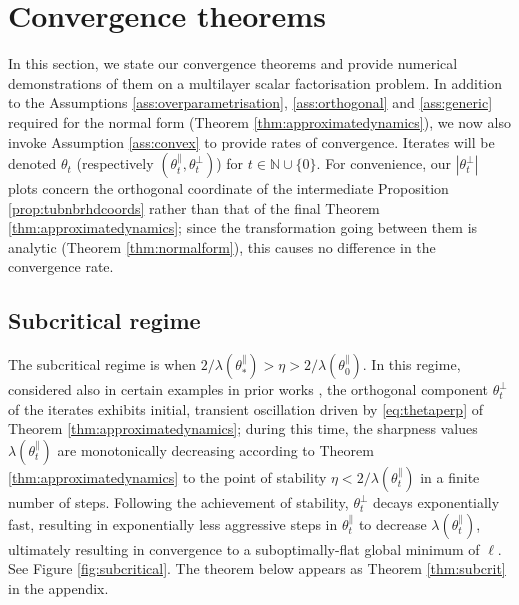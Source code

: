 \documentclass{article}
\newcommand{\NB}{\mathbb{N}}
\newcommand{\tpa}{\theta^{\parallel}}
\newcommand{\tpe}{\theta^{\perp}}
\theoremstyle{plain}
\theoremstyle{definition}
\theoremstyle{remark}
\begin{document}
\section{Convergence theorems}

In this section, we state our convergence theorems and provide numerical demonstrations of them on a multilayer scalar factorisation problem. In addition to the Assumptions \ref{ass:overparametrisation}, \ref{ass:orthogonal} and \ref{ass:generic} required for the normal form (Theorem \ref{thm:approximatedynamics}), we now also invoke Assumption \ref{ass:convex} to provide rates of convergence. Iterates will be denoted $\theta_t$ (respectively $(\tpa_t,\tpe_t)$) for $t\in\NB\cup\{0\}$. For convenience, our $|\tpe_t|$ plots concern the orthogonal coordinate of the intermediate Proposition \ref{prop:tubnbrhdcoords} rather than that of the final Theorem \ref{thm:approximatedynamics}; since the transformation going between them is analytic (Theorem \ref{thm:normalform}), this causes no difference in the convergence rate.

\subsection{Subcritical regime}

The subcritical regime is when $2/\lambda(\theta^{\parallel}_*)>\eta>2/\lambda(\theta^{\parallel}_0)$. In this regime, considered also in certain examples in prior works \cite{kreislereos, liueos}, the orthogonal component $\theta^{\perp}_t$ of the iterates exhibits initial, transient oscillation driven by \eqref{eq:thetaperp} of Theorem \ref{thm:approximatedynamics}; during this time, the sharpness values $\lambda(\tpa_t)$ are monotonically decreasing according to Theorem \ref{thm:approximatedynamics} to the point of stability $\eta<2/\lambda(\theta^{\parallel}_t)$ in a finite number of steps. Following the achievement of stability, $\theta^{\perp}_t$ decays exponentially fast, resulting in exponentially less aggressive steps in $\theta^{\parallel}_t$ to decrease $\lambda(\theta^{\parallel}_t)$, ultimately resulting in convergence to a suboptimally-flat global minimum of $\ell$. See Figure \ref{fig:subcritical}. The theorem below appears as Theorem \ref{thm:subcrit} in the appendix.
\end{document}
